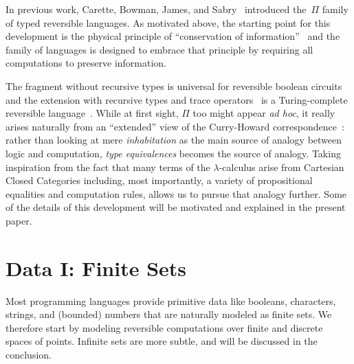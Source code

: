 \documentclass{article}
\begin{document}
In previous work, Carette, Bowman, James, and
Sabry~\cite{rc2011,James:2012:IE:2103656.2103667,Carette2016}
introduced the~$\Pi$ family of typed reversible languages.  As motivated above,
the starting point for this development is the physical principle of
``conservation of
information''~\cite{Hey:1999:FCE:304763,fredkin1982conservative} and
the family of languages is designed to embrace that principle by
requiring all computations to preserve information. 

The fragment without
recursive types is universal for reversible boolean
circuits~\cite{James:2012:IE:2103656.2103667} and the extension with
recursive types and trace
operators~\cite{Hasegawa:1997:RCS:645893.671607} is a Turing-complete
reversible language~\cite{James:2012:IE:2103656.2103667,rc2011}. While
at first sight, $\Pi$ too might appear \emph{ad hoc}, it really arises
naturally from an ``extended'' view of the Curry-Howard
correspondence~\cite{Carette2016}: rather than looking at mere
\emph{inhabitation} as the main source of analogy between logic and
computation, \emph{type equivalences} becomes the source of analogy.
Taking inspiration from the fact that many terms of the $\lambda$-calculus
arise from Cartesian Closed Categories including, most importantly,
a variety of propositional equalities and computation rules,
allows us to pursue that analogy further. Some of the details
of this development will be motivated and explained in the
present paper.

\section{Data I: Finite Sets}
\label{sec:dataone}

Most programming languages provide primitive data like booleans,
characters, strings, and (bounded) numbers that are naturally modeled
as finite sets. We therefore start by modeling reversible computations
over finite and discrete spaces of points. Infinite sets are more
subtle, and will be discussed in the conclusion.
\end{document}
